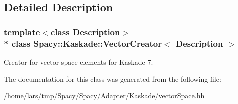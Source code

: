 \subsection{Detailed Description}
\subsubsection*{template$<$class Description$>$\\*
class Spacy\+::\+Kaskade\+::\+Vector\+Creator$<$ Description $>$}

Creator for vector space elements for Kaskade 7. 

The documentation for this class was generated from the following file\+:\begin{DoxyCompactItemize}
\item 
/home/lars/tmp/\+Spacy/\+Spacy/\+Adapter/\+Kaskade/vector\+Space.\+hh\end{DoxyCompactItemize}

